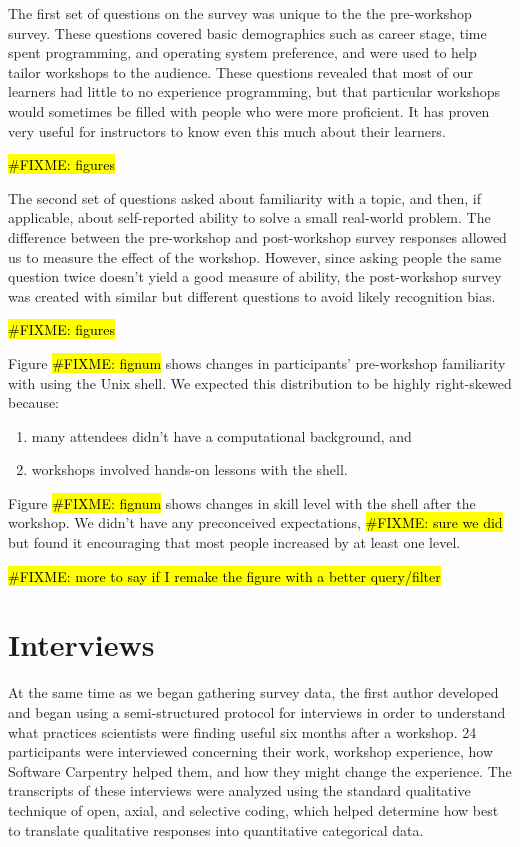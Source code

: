 \documentclass[submission,copyright,creativecommons]{eptcs}
\newcommand{\fixme}[1]{\hl{\#FIXME: #1}}
\begin{document}
The first set of questions on the survey was unique to the the pre-workshop survey.
These questions covered basic demographics such as career stage,
time spent programming,
and operating system preference,
and were used to help tailor workshops to the audience.
These questions revealed that most of our learners had little to no experience programming,
but that particular workshops would sometimes be filled with people who were more proficient.
It has proven very useful for instructors to know even this much about their learners.

\fixme{figures}

The second set of questions asked about familiarity with a topic,
and then,
if applicable,
about self-reported ability to solve a small real-world problem.
The difference between the pre-workshop and post-workshop survey responses allowed us to measure the effect of the workshop.
However, since asking people the same question twice doesn't yield a good measure of ability,
the post-workshop survey was created with similar but different questions to avoid likely recognition bias.

\fixme{figures}

Figure \fixme{fignum} shows changes in participants' pre-workshop familiarity with using the Unix shell.
We expected this distribution to be highly right-skewed because:

\begin{enumerate}
\item 
many attendees didn't have a computational background, and

\item 
workshops involved hands-on lessons with the shell.
\end{enumerate}

Figure \fixme{fignum} shows changes in skill level with the shell after the workshop.
We didn't have any preconceived expectations, \fixme{sure we did}
but found it encouraging that most people increased by at least one level.

\fixme{more to say if I remake the figure with a better query/filter}

\section{Interviews}

At the same time as we began gathering survey data,
the first author developed and began using a semi-structured protocol for interviews
in order to understand what practices scientists were finding useful six months after a workshop.
24 participants were interviewed concerning their work,
workshop experience,
how Software Carpentry helped them,
and how they might change the experience.
The transcripts of these interviews were analyzed
using the standard qualitative technique of open, axial, and selective coding,
which helped determine how best to translate qualitative responses into quantitative categorical data.
\end{document}
